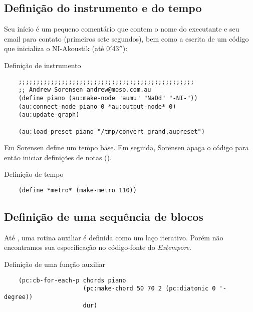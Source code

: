\subsection{Definição do instrumento e do tempo}\label{sec:define_instr}

Seu início é um pequeno comentário que contem o nome do executante e seu email para contato (primeiros sete segundos), bem como a escrita de um código que inicializa o NI-Akoustik (até 0$'$43$''$): 

\begin{example}{Definição de instrumento}
  \begin{verbatim}
    ;;;;;;;;;;;;;;;;;;;;;;;;;;;;;;;;;;;;;;;;;;;;;;;;;
    ;; Andrew Sorensen andrew@moso.com.au
    (define piano (au:make-node "aumu" "NaDd" "-NI-"))
    (au:connect-node piano 0 *au:output-node* 0)
    (au:update-graph)

    (au:load-preset piano "/tmp/convert_grand.aupreset")
  \end{verbatim}
  \label{fig:SIK_piano}
\end{example}


Em  Sorensen define um tempo base. Em seguida, Sorensen apaga o código para então iniciar definições de notas ().

\begin{example}{Definição de tempo}\label{ex:def_tempo}
  \centering
  \begin{verbatim}
    (define *metro* (make-metro 110))
  \end{verbatim}
  
\end{example}

\subsection{Definição de uma sequência de blocos}

Até , uma rotina auxiliar é definida como um laço iterativo. Porém não encontramos sua especificação no código-fonte do \emph{Extempore}.

\begin{example}{Definição de uma função auxiliar}
  \begin{verbatim}
    (pc:cb-for-each-p chords piano
                      (pc:make-chord 50 70 2 (pc:diatonic 0 '- degree))
                      dur)
  \end{verbatim}
\end{example}

